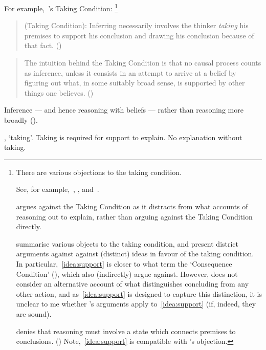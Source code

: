 \begin{note}
  For example,~\citeauthor{Boghossian:2014aa}'s Taking Condition:%
  \footnote{
    There are various objections to the taking condition.

    See, for example,~\textcite{Hlobil:2014tq}, \textcite{McHugh:2016vp}, and~\textcite{Wright:2014tt}.

    \citeauthor{Hlobil:2014tq} argues against the Taking Condition as it distracts from what accounts of reasoning out to explain, rather than arguing against the Taking Condition directly.

    \citeauthor{McHugh:2016vp} summarise various objects to the taking condition, and present district arguments against against (distinct) ideas in favour of the taking condition.
    In particular,~\autoref{idea:support} is closer to what \citeauthor{McHugh:2016vp} term the `Consequence Condition' (\citeyear[cf.][316]{McHugh:2016vp}), which \citeauthor{McHugh:2016vp} also (indirectly) argue against.
    However, \citeauthor{McHugh:2016vp} does not consider an alternative account of what distinguishes concluding from any other action, and as~\autoref{idea:support} is designed to capture this distinction, it is unclear to me whether \citeauthor{McHugh:2016vp}'s arguments apply to~\autoref{idea:support} (if, indeed, they are sound).

    \citeauthor{Wright:2014tt} denies that reasoning must involve a state which connects premises to conclusions. (\citeyear[Cf.][33-34]{Wright:2014tt})
    Note,~\autoref{idea:support} is compatible with \citeauthor{Wright:2014tt}'s objection.
  }

  \begin{quote}
    (Taking Condition):
    Inferring necessarily involves the thinker \emph{taking} his premises to support his conclusion and drawing his conclusion because of that fact.%
    \mbox{}\hfill\mbox{(\citeyear[5]{Boghossian:2014aa})}
  \end{quote}

  \begin{quote}
    The intuition behind the Taking Condition is that no causal process counts as inference, unless it consists in an attempt to arrive at a belief by figuring out what, in some suitably broad sense, is supported by other things one believes.%
    \mbox{}\hfill\mbox{(\citeyear[5]{Boghossian:2014aa})}
  \end{quote}

  Inference --- and hence reasoning with beliefs --- rather than reasoning more broadly (\citeyear[cf][2]{Boghossian:2014aa}).

  \citeauthor{Boghossian:2014aa}, `taking'.
  Taking is required for support to explain.
  No explanation without taking.
\end{note}

